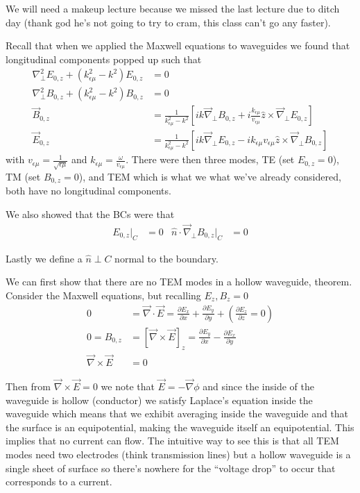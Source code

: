 \documentclass[10pt]{report}
\newcommand{\pd}[2]{\frac{\partial #1}{\partial#2}}
\begin{document}
We will need a makeup lecture because we missed the last lecture due to ditch day (thank god he's not going to try to cram, this class can't go any faster).

Recall that when we applied the Maxwell equations to waveguides we found that longitudinal components popped up such that
\begin{align}
    \nabla^2_{\perp}E_{0,z} + (k_{\epsilon \mu}^2 - k^2)E_{0,z} &= 0\label{5.20.MEs}\\
    \nabla^2_{\perp}B_{0,z} + (k_{\epsilon \mu}^2 - k^2)B_{0,z} &= 0\\
    \vec{B}_{0,z} &= \frac{1}{k_{\epsilon \mu}^2 - k^2}\left[ ik\vec{\nabla}_{\perp} B_{0,z} + i\frac{k_{\epsilon \mu}}{v_{\epsilon \mu}}\hat{z} \times \vec{\nabla} _{\perp}E_{0,z} \right]\\
    \vec{E}_{0,z} &= \frac{1}{k_{\epsilon \mu}^2 - k^2}\left[ ik\vec{\nabla}_{\perp} E_{0,z} - ik_{\epsilon \mu}v_{\epsilon \mu}\hat{z} \times \vec{\nabla} _{\perp}B_{0,z} \right]
\end{align}
with $v_{\epsilon \mu} = \frac{1}{\sqrt{\epsilon \mu}}$ and $k_{\epsilon \mu} = \frac{\omega}{v_{\epsilon \mu}}$. There were then three modes, TE (set $E_{0,z} = 0$), TM (set $B_{0,z} = 0$), and TEM which is what we what we've already considered, both have no longitudinal components.

We also showed that the BCs were that
\begin{align}
    E_{0,z}\Bigg|_C &= 0 & \hat{n} \cdot \vec{\nabla}_{\perp}B_{0,z} \Bigg|_C &= 0
\end{align}

Lastly we define a $\hat{n} \perp C$ normal to the boundary.

We can first show that there are no TEM modes in a hollow waveguide, theorem. Consider the Maxwell equations, but recalling $E_z, B_z =0$
\begin{align}
    0 &= \vec{\nabla} \cdot \vec{E} = \pd{E_x}{x} + \pd{E_y}{y} + \left( \pd{E_z}{z} = 0 \right)\\
    0 = B_{0,z} &= \left[\vec{\nabla} \times \vec{E}\right]_z = \pd{E_y}{x} - \pd{E_x}{y}\\
    \vec{\nabla} \times \vec{E} &= 0
\end{align}

Then from $\vec{\nabla} \times \vec{E} = 0$ we note that $\vec{E} = -\vec{\nabla} \phi$ and since the inside of the waveguide is hollow (conductor) we satisfy  Laplace's equation inside the waveguide which means that we exhibit averaging inside the waveguide and that the surface is an equipotential, making the waveguide itself an equipotential. This implies that no current can flow. The intuitive way to see this is that all TEM modes need two electrodes (think transmission lines) but a hollow waveguide is a single sheet of surface so there's nowhere for the ``voltage drop'' to occur that corresponds to a current.
\end{document}
